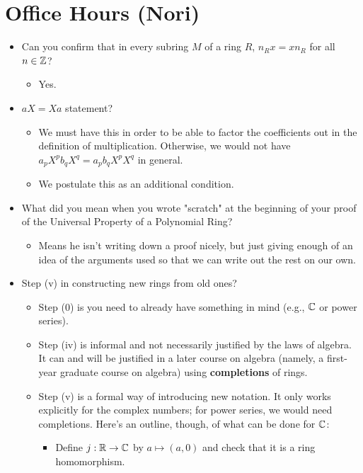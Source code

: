 \documentclass[../notes.tex]{subfiles}
\begin{document}
\section{Office Hours (Nori)}
\begin{itemize}
    \item Can you confirm that in every subring $M$ of a ring $R$, $n_Rx=xn_R$ for all $n\in\mathbb{Z}$?
    \begin{itemize}
        \item Yes.
    \end{itemize}
    \item $aX=Xa$ statement?
    \begin{itemize}
        \item We must have this in order to be able to factor the coefficients out in the definition of multiplication. Otherwise, we would not have $a_pX^pb_qX^q=a_pb_qX^pX^q$ in general.
        \item We postulate this as an additional condition.
    \end{itemize}
    \item What did you mean when you wrote "scratch" at the beginning of your proof of the Universal Property of a Polynomial Ring?
    \begin{itemize}
        \item Means he isn't writing down a proof nicely, but just giving enough of an idea of the arguments used so that we can write out the rest on our own.
    \end{itemize}
    \item Step (v) in constructing new rings from old ones?
    \begin{itemize}
        \item Step (0) is you need to already have something in mind (e.g., $\mathbb{C}$ or power series).
        \item Step (iv) is informal and not necessarily justified by the laws of algebra. It can and will be justified in a later course on algebra (namely, a first-year graduate course on algebra) using \textbf{completions} of rings.
        \item Step (v) is a formal way of introducing new notation. It only works explicitly for the complex numbers; for power series, we would need completions. Here's an outline, though, of what can be done for $\mathbb{C}$:
        \begin{itemize}
            \item Define $j:\mathbb{R}\to\mathbb{C}$ by $a\mapsto(a,0)$ and check that it is a ring homomorphism.

\end{itemize}
\end{itemize}
\end{itemize}
\end{document}
